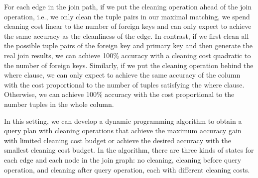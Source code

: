 For each edge in the join path, if we put the cleaning operation ahead of the join operation, i.e., we only clean the tuple pairs in our maximal matching, we spend cleaning cost linear to the number of foreign keys and can only expect to achieve the same accuracy  as the cleanliness of the edge. In contrast, if we first clean all the possible tuple pairs of the foreign key and primary key and then generate the real join results, we can achieve 100\% accuracy with a cleaning cost quadratic to the number of foreign keys. Similarly, if we put the cleaning operation behind the where clause, we can only expect to achieve the same accuracy of the column with the cost proportional to the number of tuples satisfying the where clause. Otherwise, we can achieve 100\% accuracy with the cost proportional to the number tuples in the whole column.


In this setting, we can develop a dynamic programming algorithm to obtain a query plan with cleaning operations that achieve the maximum accuracy gain with limited cleaning cost budget or achieve the desired accuracy with the smallest cleaning cost budget. In the algorithm, there are three kinds of states for each edge and each node in the join graph: 
no cleaning, cleaning before query operation, and cleaning after query operation, each with different cleaning costs.



